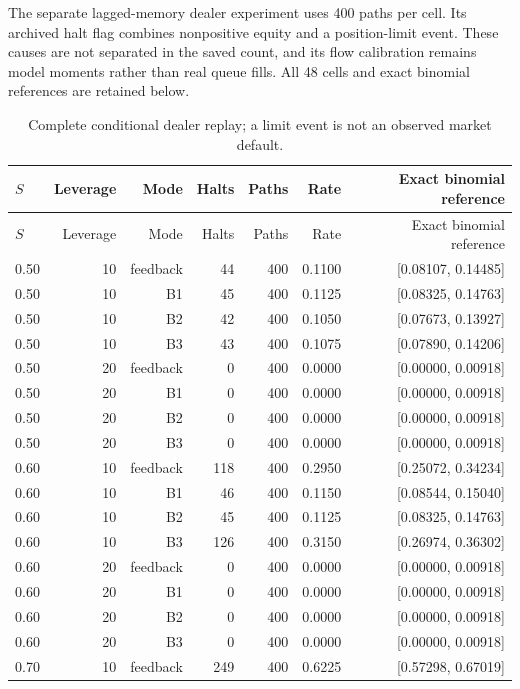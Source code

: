 \documentclass[10pt]{article}
\begin{document}
The separate lagged-memory dealer experiment uses 400 paths per cell. Its archived halt flag combines nonpositive equity and a position-limit event. These causes are not separated in the saved count, and its flow calibration remains model moments rather than real queue fills. All 48 cells and exact binomial references are retained below.


\small\setlength{\tabcolsep}{3pt}
\begin{longtable}{lrrrrrr}
\caption{Complete conditional dealer replay; a limit event is not an observed market default.}\label{tab:all_lagged_dealer_cells}\\
\toprule
$S$ & Leverage & Mode & Halts & Paths & Rate & Exact binomial reference \\\midrule\endfirsthead
\toprule
$S$ & Leverage & Mode & Halts & Paths & Rate & Exact binomial reference \\\midrule\endhead
0.50 & 10 & feedback & 44 & 400 & 0.1100 & [0.08107, 0.14485] \\
0.50 & 10 & B1 & 45 & 400 & 0.1125 & [0.08325, 0.14763] \\
0.50 & 10 & B2 & 42 & 400 & 0.1050 & [0.07673, 0.13927] \\
0.50 & 10 & B3 & 43 & 400 & 0.1075 & [0.07890, 0.14206] \\
0.50 & 20 & feedback & 0 & 400 & 0.0000 & [0.00000, 0.00918] \\
0.50 & 20 & B1 & 0 & 400 & 0.0000 & [0.00000, 0.00918] \\
0.50 & 20 & B2 & 0 & 400 & 0.0000 & [0.00000, 0.00918] \\
0.50 & 20 & B3 & 0 & 400 & 0.0000 & [0.00000, 0.00918] \\
0.60 & 10 & feedback & 118 & 400 & 0.2950 & [0.25072, 0.34234] \\
0.60 & 10 & B1 & 46 & 400 & 0.1150 & [0.08544, 0.15040] \\
0.60 & 10 & B2 & 45 & 400 & 0.1125 & [0.08325, 0.14763] \\
0.60 & 10 & B3 & 126 & 400 & 0.3150 & [0.26974, 0.36302] \\
0.60 & 20 & feedback & 0 & 400 & 0.0000 & [0.00000, 0.00918] \\
0.60 & 20 & B1 & 0 & 400 & 0.0000 & [0.00000, 0.00918] \\
0.60 & 20 & B2 & 0 & 400 & 0.0000 & [0.00000, 0.00918] \\
0.60 & 20 & B3 & 0 & 400 & 0.0000 & [0.00000, 0.00918] \\
0.70 & 10 & feedback & 249 & 400 & 0.6225 & [0.57298, 0.67019] \\

\end{longtable}
\end{document}

